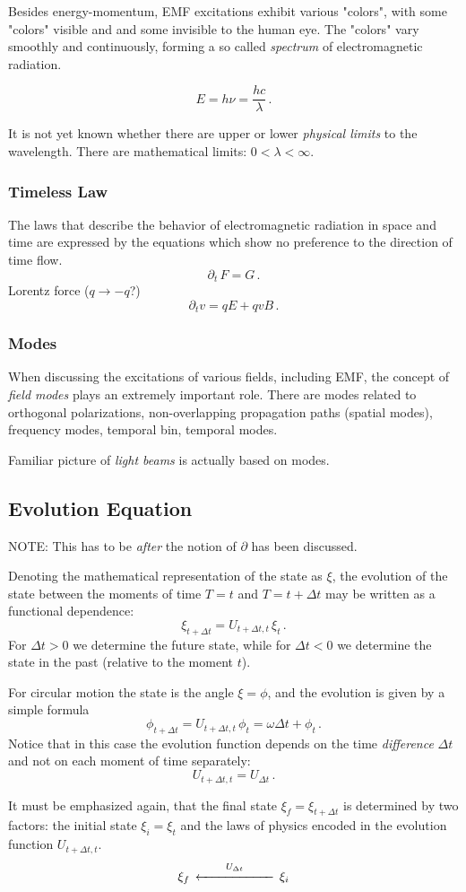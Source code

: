 Besides energy-momentum, EMF excitations exhibit various "colors", with some "colors" visible and and some invisible to the human eye. The "colors" vary smoothly and continuously, forming a so called \emph{spectrum} of electromagnetic radiation.

\[
E=h\nu = \frac{hc}{\lambda}\,.
\]

It is not yet known whether there are upper or lower \emph{physical limits} to the wavelength. There are mathematical limits: $0 < \lambda <\infty$.

\subsubsection*{Timeless Law}
The laws that describe the behavior of electromagnetic radiation in space and time are expressed by the equations which show no preference to the direction of time flow.
\[
\partial_t\, F = G\,.
\]
Lorentz force ($q\to -q$?)
\[
\partial_t v = qE + qvB\,.
\]

\subsubsection*{Modes}
When discussing the excitations of various fields, including EMF, the concept of \emph{field modes} plays an extremely important role. There are modes related to orthogonal polarizations, non-overlapping propagation paths (spatial modes), frequency modes, temporal bin, temporal modes. 

Familiar picture of \emph{light beams} is actually based on modes.

\subsection*{Evolution Equation}
NOTE: This has to be \emph{after} the notion of $\partial$ has been discussed.


Denoting the mathematical representation of the state as $\xi$, the evolution of the state between the moments of time $T=t$ and $T=t+\Delta t$ may be written as a functional dependence:
\[
\xi_{t+\Delta t} = U_{t+\Delta t, t}\,\xi_t\,.
\]
For $\Delta t > 0$ we determine the future state, while for $\Delta t < 0$ we determine the state in the past (relative to the moment $t$).
\begin{myExample}
	For circular motion the state is the angle $\xi=\phi$, and the evolution is given by a simple formula
	\[
	\phi_{t+\Delta t} = U_{t+\Delta t, t}\,\phi_t=\omega \Delta t + \phi_t\,.	
	\]
	Notice that in this case the evolution function depends on the time \emph{difference} $\Delta t$ and not on each moment of time separately:
	\[
	U_{t+\Delta t, t} = U_{\Delta t}\,.
	\]
\end{myExample}
It must be emphasized again, that the final state $\xi_f=\xi_{t+\Delta t}$ is determined by two factors: the initial state $\xi_i=\xi_t$ and the laws of physics encoded in the evolution function $U_{t+\Delta t, t}$. 
\[
\xi_f\, \overset{U_{\Delta t}}{\xleftarrow{\hspace*{2cm}}}\, \xi_i
\]

